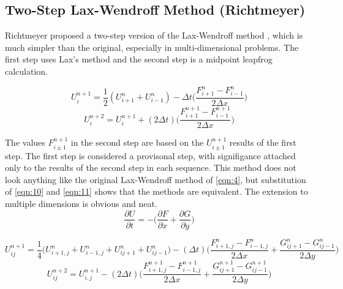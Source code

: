 \subsection{Two-Step Lax-Wendroff Method (Richtmeyer)}

Richtmeyer proposed a two-step version of the Lax-Wendroff method \cite{Roach}, which is much simpler than the original, especially in multi-dimensional problems.
The first step uses Lax's method and the second step is a midpoint leapfrog calculation. 

\begin{equation}\label{eqn:8}
U_{i}^{n+1} = \frac{1}{2}(U_{i+1}^{n}+U_{i-1}^{n})-\Delta{t} \Big(\frac{F_{i+1}^{n}-F_{i-1}^{n}}{2\Delta x}\Big)
\end{equation}
\begin{equation}\label{eqn:9}
U_{i}^{n+2} = U_{i}^{n+1} + (2\Delta t) \Big ( \frac{ F_{i+1}^{n+1}-F_{i-1}^{n+1} }{ 2 \Delta x } \Big)
\end{equation} 
\newline

The values $F_{i \pm 1}^{n+1}$ in the second step are based on the $U_{i \pm 1}^{n+1}$ results of the first step. The first step is considered
a provisonal step, with signifigance attached only to the results of the second step in each sequence. This method does not look anything like the original
Lax-Wendroff method of \eqref{eqn:4}, but substitution of \eqref{eqn:10} and \eqref{eqn:11} shows that the methods are equivalent. 
\newline
The extension to multiple dimensions is obvious and neat.
\begin{equation}\label{eqn:10}
\frac{\partial U}{\partial t} = - \Big( \frac{\partial F}{\partial x} + \frac{\partial G}{\partial y} \Big)
\end{equation}

\begin{dmath}\label{eqn:11}
U_{ij}^{n+1} = \frac{1}{4} \Big( U_{i+1,j}^{n} + U_{i-1,j}^{n} + U_{ij+1}^{n} + U_{ij-1}^{n} \Big) 
- (\Delta t) \Big( \frac{ F_{i+1,j}^{n} - F_{i-1,j}^{n} }{2 \Delta x}  + \frac{ G_{ij+1}^{n} - G_{ij-1}^{n} }{ 2 \Delta y }  \Big)
\end{dmath}
\begin{dmath}\label{eqn:11_1}
U_{ij}^{n+2} = U_{i,j}^{n+1} -
  (2\Delta t) \Big( \frac{ F_{i+1,j}^{n+1} - F_{i-1,j}^{n+1} }{2 \Delta x}  + \frac{ G_{ij+1}^{n+1} - G_{ij-1}^{n+1} }{ 2 \Delta y }  \Big)
\end{dmath} 

